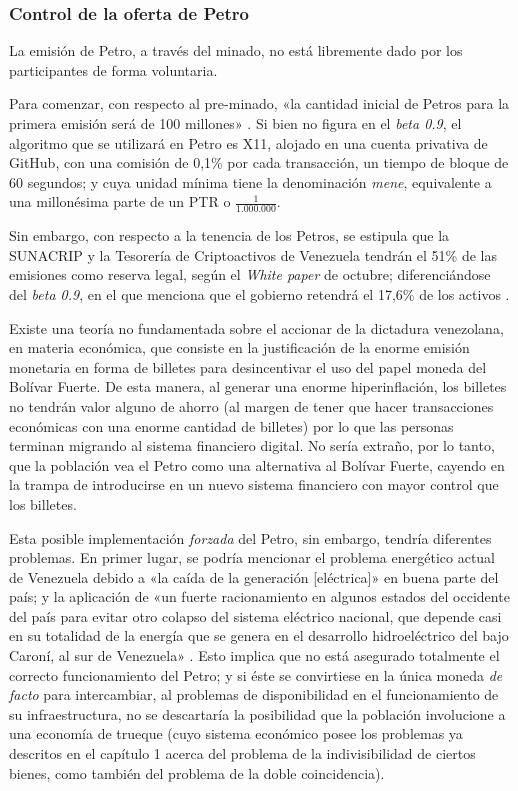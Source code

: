 \documentclass[12pt,a4paper,twoside]{book}
\begin{document}
\subsubsection{Control de la oferta de Petro}
La emisión de Petro, a través del minado, no está libremente dado por los participantes de forma voluntaria. 

Para comenzar, con respecto al pre-minado, «la cantidad inicial de Petros para la primera emisión será de 100 millones» \cite[pág. 9]{petro:whitepaper}. Si bien no figura en el \textit{beta 0.9}, el algoritmo que se utilizará en Petro es X11, alojado en una cuenta privativa de GitHub, con una comisión de 0,1\% por cada transacción, un tiempo de bloque de 60 segundos; y cuya unidad mínima tiene la denominación \textit{mene}, equivalente a una millonésima parte de un PTR o $ \frac{1}{1.000.000} $.

Sin embargo, con respecto a la tenencia de los Petros, se estipula que la SUNACRIP y la Tesorería de Criptoactivos de Venezuela tendrán el 51\% de las emisiones como reserva legal, según el \textit{White paper} de octubre; diferenciándose del \textit{beta 0.9}, en el que menciona que el gobierno retendrá el 17,6\% de los activos \cite[pág. 17]{petro:whitepaper-inicial}.

Existe una teoría no fundamentada sobre el accionar de la dictadura venezolana, en materia económica, que consiste en la justificación de la enorme emisión monetaria en forma de billetes para desincentivar el uso del papel moneda del Bolívar Fuerte. De esta manera, al generar una enorme hiperinflación, los billetes no tendrán valor alguno de ahorro (al margen de tener que hacer transacciones económicas con una enorme cantidad de billetes) por lo que las personas terminan migrando al sistema financiero digital. No sería extraño, por lo tanto, que la población vea el Petro como una alternativa al Bolívar Fuerte, cayendo en la trampa de introducirse en un nuevo sistema financiero con mayor control que los billetes.
 
Esta posible implementación \textit{forzada} del Petro, sin embargo, tendría diferentes problemas. En primer lugar, se podría mencionar el problema energético actual de Venezuela debido a «la caída de la generación [eléctrica]» en buena parte del país; y la aplicación de «un fuerte racionamiento en algunos estados del occidente del país para evitar otro colapso del sistema eléctrico nacional, que depende casi en su totalidad de la energía que se genera en el desarrollo hidroeléctrico del bajo Caroní, al sur de Venezuela» \cite {venezuela:apagones}. Esto implica que no está asegurado totalmente el correcto funcionamiento del Petro; y si éste se convirtiese en la única moneda \textit{de facto} para intercambiar, al problemas de disponibilidad en el funcionamiento de su infraestructura, no se descartaría la posibilidad que la población involucione a una economía de trueque (cuyo sistema económico posee los problemas ya descritos en el capítulo 1 acerca del problema de la indivisibilidad de ciertos bienes, como también del problema de la doble coincidencia).
\end{document}
